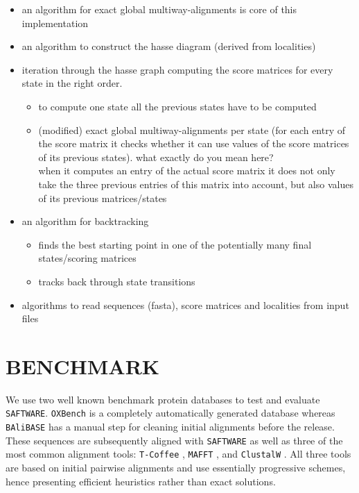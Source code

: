 \documentclass[a4paper,10pt]{article}
\newcommand{\TODO}[1]{\begingroup\color{red}#1\endgroup}
\newcommand{\PFS}[1]{\begingroup\color{green}#1\endgroup}
\newcommand{\FK}[1]{\begingroup\color{blue}#1\endgroup}
\newcommand{\SAFTWARE}{\TODO{\texttt{SAFTWARE}}}
\begin{document}
\FK{
\begin{itemize}
    \item an algorithm for exact global multiway-alignments is core of this implementation
    \item an algorithm to construct the hasse diagram (derived from localities)
    \item iteration through the hasse graph computing the score matrices for every state in the right order. 
    \begin{itemize}
        \item to compute one state all the previous states have to be computed
        \item (modified) exact global multiway-alignments per state (for
          each entry of the score matrix it checks whether it can use
          values of the score matrices of its previous states).
          \TODO{what exactly do you mean here?} \\
          when it computes an entry of the actual score matrix it does not only take the three previous entries of this matrix into account, but also values of its previous matrices/states
    \end{itemize}
    \item an algorithm for backtracking
    \begin{itemize}
        \item finds the best starting point in one of the potentially many final states/scoring matrices
        \item tracks back through state transitions 
    \end{itemize}
    \item algorithms to read sequences (fasta), score matrices and localities from input files
\end{itemize}
}

\section{\uppercase{Benchmark}}

We use two well known benchmark protein databases to test and evaluate
\SAFTWARE. \texttt{OXBench} \cite{oxbench} is a completely automatically
generated database whereas \texttt{BAliBASE} \cite{balibase} has a manual
step for cleaning initial alignments before the release. These sequences
are subsequently aligned with \SAFTWARE{} as well as three of the most
common alignment tools: \texttt{T-Coffee} \cite{Notredame:00},
\texttt{MAFFT} \cite{Katoh:05}, and \texttt{ClustalW}
\cite{Larkin:07}. \PFS{All three tools are based on initial pairwise
  alignments and use essentially progressive schemes, hence presenting
  efficient heuristics rather than exact solutions.}
\end{document}
